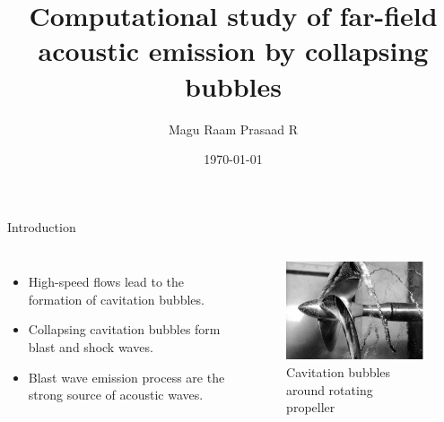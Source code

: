 \documentclass[10pt, aspectratio=169]{beamer}
\title{Computational study of far-field acoustic emission by collapsing bubbles}
\date{\today}
\author[shortname]{Magu Raam Prasaad R}
\institute[shortinst]{Indian Institute of Science, Bangalore}
\begin{document}
\begin{frame}
	\maketitle
\end{frame}

\begin{frame}{Introduction}
	\begin{columns}
		\begin{itemize}
			\item High-speed flows lead to the formation of cavitation bubbles.
			\item Collapsing cavitation bubbles form blast and shock waves.
			\item Blast wave emission process are the strong source of acoustic waves.
		\end{itemize}
				
		\begin{figure}[h]
			\includegraphics[scale = 0.55]{images/propeller.png}
			\caption{Cavitation bubbles around rotating propeller\cite{propeller}}	
		\end{figure}
							
	\end{columns}
\end{frame}
\end{document}
